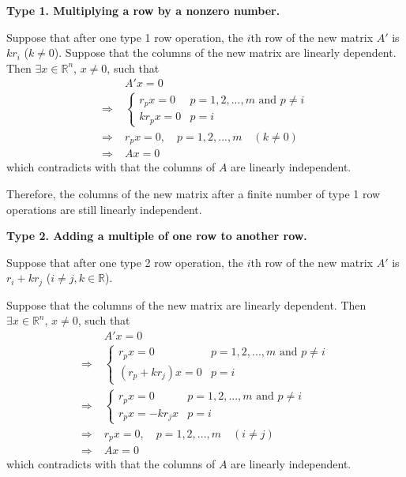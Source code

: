 \documentclass[12pt]{article}
\begin{document}
\vspace{\baselineskip}

\textbf{Type 1. Multiplying a row by a nonzero number.}

Suppose that after one type 1 row operation, the $i$th row of the new matrix $A'$ is $kr_i$ ($k\ne 0$). Suppose that the columns of the new matrix are linearly dependent. Then $\exists x \in \mathbb{R}^n$, $x\ne 0$, such that
\begin{align*}
    & A'x=0 \\
    \Rightarrow \; & \begin{cases}
    r_px=0 & p=1,2, ... ,m \text{~and~} p\ne i \\
    kr_px=0 & p=i
    \end{cases} \\
    \Rightarrow \; & r_px=0, \quad p=1,2,...,m \quad (k\ne 0) \\
    \Rightarrow \; & Ax=0
\end{align*}
which contradicts with that the columns of $A$ are linearly independent.

Therefore, the columns of the new matrix after a finite number of type 1 row operations are still linearly independent.

\vspace{\baselineskip}

\textbf{Type 2. Adding a multiple of one row to another row.}

Suppose that after one type 2 row operation, the $i$th row of the new matrix $A'$ is $r_i+kr_j$ ($i\ne j, k\in \mathbb{R}$). 

Suppose that the columns of the new matrix are linearly dependent. Then $\exists x \in \mathbb{R}^n$, $x\ne 0$, such that
\begin{align*}
    & A'x=0 \\
    \Rightarrow \; & \begin{cases}
    r_px=0 & p=1,2, ... ,m \text{~and~} p\ne i \\
    (r_p+kr_j)x=0 & p=i
    \end{cases} \\
    \Rightarrow \; & \begin{cases}
    r_px=0 & p=1,2, ... ,m \text{~and~} p\ne i \\
    r_px = -kr_jx & p=i
    \end{cases} \\
    \Rightarrow \; & r_px=0, \quad p=1,2,...,m \quad (i\ne j) \\
    \Rightarrow \; & Ax=0
\end{align*}
which contradicts with that the columns of $A$ are linearly independent.
\end{document}
